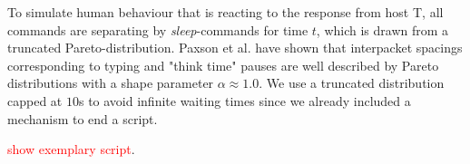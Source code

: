 \documentclass[runningheads]{llncs}\usepackage[]{graphicx}\usepackage[]{color}
\begin{document}
To simulate human behaviour that is reacting to the response from host T, all commands are separating by \textit{sleep}-commands for time $t$, which is drawn from a truncated Pareto-distribution. Paxson et al. \cite{paxson1995wide} have shown that interpacket spacings corresponding to typing and "think time" pauses are well described by Pareto distributions with a shape parameter $\alpha\approx 1.0$. We use a truncated distribution capped at $10$s to avoid infinite waiting times since we already included a mechanism to end a script. 



\textcolor{red}{show exemplary script}.


\end{document}

